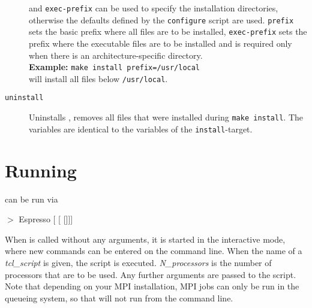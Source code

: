 \begin{description}
  and \texttt{exec-prefix} can be used to specify the installation
  directories, otherwise the defaults defined by the
  \texttt{configure} script are used. \texttt{prefix} sets the basic
  prefix where all \es{} files are to be installed,
  \texttt{exec-prefix} sets the prefix where the executable files are
  to be installed and is required only when there is an
  architecture-specific directory.\\
  \textbf{Example:} \verb!make install prefix=/usr/local!\\
  will install all files below \texttt{/usr/local}.
\item[\texttt{uninstall}] Uninstalls \es{}, \ie{} removes all files
  that were installed during \texttt{make install}. The variables are
  identical to the variables of the \texttt{install}-target.
\end{description}

\section{Running \es}
\label{sec:run}

\es{} can be run via
\begin{code}
$>$ Espresso [ [ []]]
\end{code}

 When \es{} is called without any arguments,
it is started in the interactive mode, where new commands can be
entered on the command line. When the name of a \textit{tcl\_script}
is given, the script is executed. \textit{N\_processors} is the number
of processors that are to be used. Any further arguments are passed to
the script. Note that depending on your MPI installation, MPI jobs can
only be run in the queueing system, so that \es{} will not run from
the command line.

